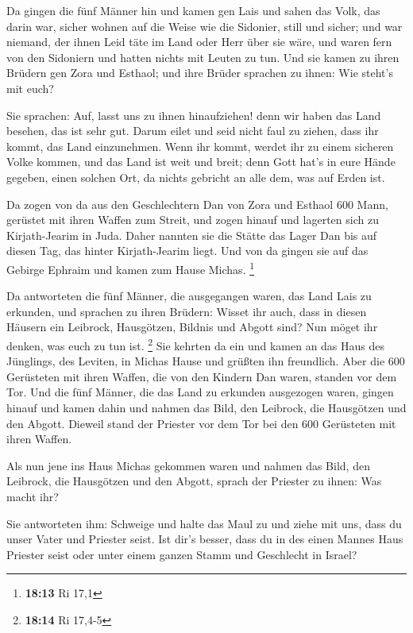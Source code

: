  Da gingen die fünf Männer hin und kamen gen Lais und
sahen das Volk, das darin war, sicher wohnen auf die Weise wie die
Sidonier, still und sicher; und war niemand, der ihnen Leid täte im Land
oder Herr über sie wäre, und waren fern von den Sidoniern und hatten
nichts mit Leuten zu tun.  Und sie kamen zu ihren Brüdern
gen Zora und Esthaol; und ihre Brüder sprachen zu ihnen: Wie steht's mit
euch?

 Sie sprachen: Auf, lasst uns zu ihnen hinaufziehen! denn
wir haben das Land besehen, das ist sehr gut. Darum eilet und seid nicht
faul zu ziehen, dass ihr kommt, das Land einzunehmen. 
Wenn ihr kommt, werdet ihr zu einem sicheren Volke kommen, und das Land
ist weit und breit; denn Gott hat's in eure Hände gegeben, einen solchen
Ort, da nichts gebricht an alle dem, was auf Erden ist.

 Da zogen von da aus den Geschlechtern Dan von Zora und
Esthaol 600 Mann, gerüstet mit ihren Waffen zum Streit, 
und zogen hinauf und lagerten sich zu Kirjath-Jearim in Juda. Daher
nannten sie die Stätte das Lager Dan bis auf diesen Tag, das hinter
Kirjath-Jearim liegt.  Und von da gingen sie auf das
Gebirge Ephraim und kamen zum Hause Michas. \footnote{\textbf{18:13} Ri
  17,1}

 Da antworteten die fünf Männer, die ausgegangen waren,
das Land Lais zu erkunden, und sprachen zu ihren Brüdern: Wisset ihr
auch, dass in diesen Häusern ein Leibrock, Hausgötzen, Bildnis und
Abgott sind? Nun möget ihr denken, was euch zu tun ist. \footnote{\textbf{18:14}
  Ri 17,4-5}  Sie kehrten da ein und kamen an das Haus
des Jünglings, des Leviten, in Michas Hause und grüßten ihn freundlich.
 Aber die 600 Gerüsteten mit ihren Waffen, die von den
Kindern Dan waren, standen vor dem Tor.  Und die fünf
Männer, die das Land zu erkunden ausgezogen waren, gingen hinauf und
kamen dahin und nahmen das Bild, den Leibrock, die Hausgötzen und den
Abgott. Dieweil stand der Priester vor dem Tor bei den 600 Gerüsteten
mit ihren Waffen.

 Als nun jene ins Haus Michas gekommen waren und nahmen
das Bild, den Leibrock, die Hausgötzen und den Abgott, sprach der
Priester zu ihnen: Was macht ihr?

 Sie antworteten ihm: Schweige und halte das Maul zu und
ziehe mit uns, dass du unser Vater und Priester seist. Ist dir's besser,
dass du in des einen Mannes Haus Priester seist oder unter einem ganzen
Stamm und Geschlecht in Israel?

